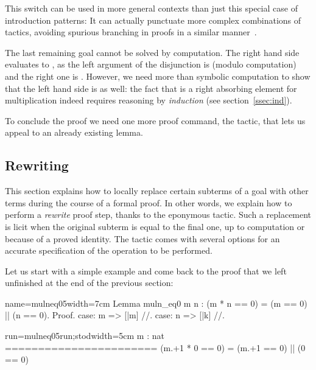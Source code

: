 This \C{//} switch can be used in
more general contexts than just this special case of introduction patterns:
It can actually punctuate more complex combinations of tactics,
avoiding spurious branching in proofs in a similar
manner~\cite[section 5.4]{ssrman}.

The last remaining goal cannot be solved by computation.
The right hand side evaluates to
, as the left argument of the disjunction is  (modulo
computation) and the right one is . However, we need
more than symbolic computation to show that the left hand side is
 as well: the fact that  is a right absorbing element for
multiplication indeed requires reasoning by \emph{induction}
(see section~\ref{ssec:ind}).

To conclude the proof we need one more proof command, the
 tactic, that lets us appeal to an already existing lemma.


\subsection{Rewriting}\label{ssec:rw}

This section explains how to locally replace certain
subterms of a goal with other terms during the course of a formal
proof. In other words, we explain how to perform a
\emph{rewrite} proof step, thanks to the eponymous  tactic.
Such a replacement is licit when the original subterm is equal
to the final one, up to computation or because of a proved
identity. The  tactic comes with several options for
an accurate specification of the operation to be performed.

Let us start with a simple example and come back to the proof that we
left unfinished at the end of the previous section:

\begin{coq-left}{name=mulneq05}{width=7cm}
Lemma muln_eq0 m n :
  (m * n == 0) = (m == 0) || (n == 0).
Proof.
case: m => [|m] //.
case: n => [|k] //.
\end{coq-left}
\begin{coqout-right}{run=mulneq05run;stod}{width=5cm}
m : nat
=======================
(m.+1 * 0 == 0) =
  (m.+1 == 0) || (0 == 0)
\end{coqout-right}

